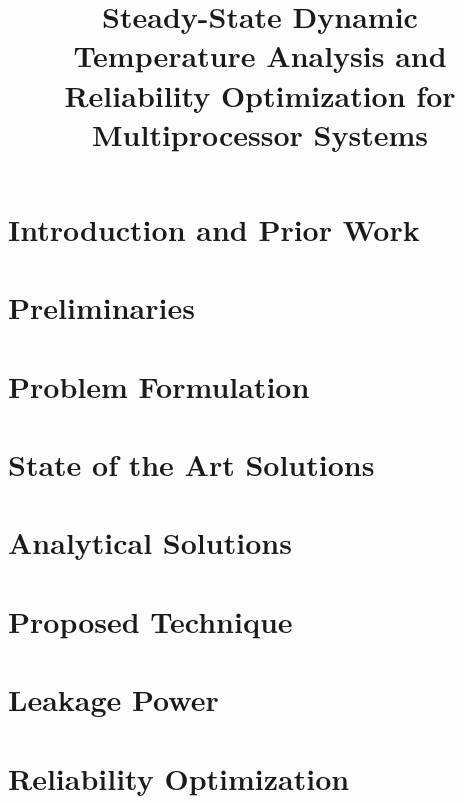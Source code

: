 \documentclass[conference]{IEEEtran}
\title{Steady-State Dynamic Temperature Analysis and Reliability Optimization for Multiprocessor Systems}
\author{}
\begin{document}
  \maketitle

  \begin{abstract}
    
  \end{abstract}

  \section{Introduction and Prior Work}
  

  \section{Preliminaries} \label{sec:preliminaries}
  

  \section{Problem Formulation} \label{sec:problem}
  

  \section{State of the Art Solutions} \label{sec:hotspot-solution}
  

  \section{Analytical Solutions} \label{sec:analytical-solution}
  

  \section{Proposed Technique} \label{sec:condensed-equation}
  

  \section{Leakage Power} \label{sec:leakage}
  

  \section{Reliability Optimization} \label{sec:reliability}
  
\end{document}
